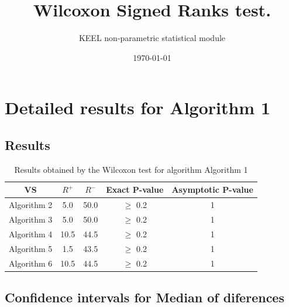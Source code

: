\documentclass[a4paper,10pt]{article}
\title{Wilcoxon Signed Ranks test.}
\date{\today}
\author{KEEL non-parametric statistical module}
\begin{document}
\pagestyle{empty}
\maketitle
\thispagestyle{empty}



\section{Detailed results for Algorithm 1}


\subsection{Results}

\begin{table}[!htp]
\centering\small
\begin{tabular}{
|c|c|c|c|c|}
\hline
 VS & $R^{+}$ & $R^{-}$ & Exact P-value & Asymptotic P-value \\ \hline 
Algorithm 2 & 5.0 & 50.0 & $\geq$ 0.2 & 1\\ \hline 
Algorithm 3 & 5.0 & 50.0 & $\geq$ 0.2 & 1\\ \hline 
Algorithm 4 & 10.5 & 44.5 & $\geq$ 0.2 & 1\\ \hline 
Algorithm 5 & 1.5 & 43.5 & $\geq$ 0.2 & 1\\ \hline 
Algorithm 6 & 10.5 & 44.5 & $\geq$ 0.2 & 1\\ \hline 

\end{tabular}
\caption{Results obtained by the Wilcoxon test for algorithm Algorithm 1}
\end{table}

\subsection{Confidence intervals for Median of diferences}
\end{document}
